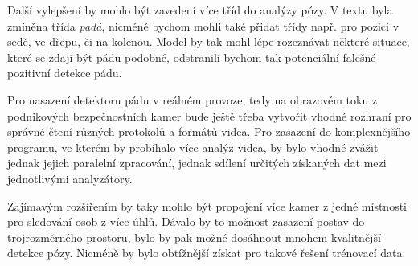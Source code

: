 Další vylepšení by mohlo být zavedení více tříd do analýzy pózy. V textu byla
zmíněna třída \textit{padá}, nicméně bychom mohli také přidat třídy např. pro
pozici v sedě, ve dřepu, či na kolenou. Model by tak mohl lépe rozeznávat
některé situace, které se zdají být pádu podobné, odstranili bychom tak
potenciální falešné pozitivní detekce pádu.

Pro nasazení detektoru pádu v reálném provoze, tedy na obrazovém toku z
podnikových bezpečnostních kamer bude ještě třeba vytvořit vhodné rozhraní pro
správné čtení různých protokolů a formátů videa. Pro zasazení do komplexnějšího
programu, ve kterém by probíhalo více analýz videa, by bylo vhodné zvážit
jednak jejich paralelní zpracování, jednak sdílení určitých získaných dat mezi
jednotlivými analyzátory.

Zajímavým rozšířením by taky mohlo být propojení více kamer z jedné místnosti
pro sledování osob z více úhlů. Dávalo by to možnost zasazení postav do
trojrozměrného prostoru, bylo by pak možné dosáhnout mnohem kvalitnější detekce
pózy. Nicméně by bylo obtížnější získat pro takové řešení trénovací data.

\endinput